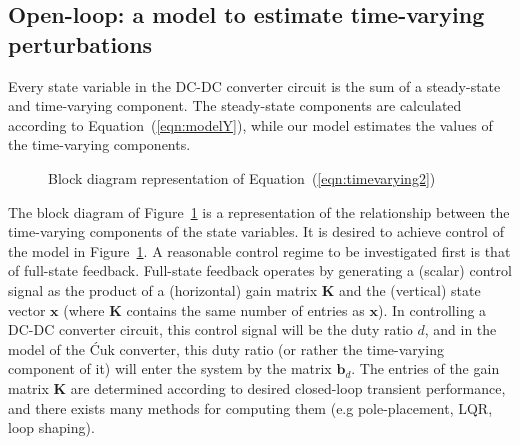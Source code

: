 \subsection{Open-loop: a model to estimate time-varying perturbations}
Every state variable in the DC-DC converter circuit is the sum of a steady-state and time-varying component. The steady-state components are calculated according to Equation~(\ref{eqn:modelY}), while our model estimates the values of the time-varying components.
\begin{figure}[H]
\centering
{}
\caption{Block diagram representation of Equation~(\ref{eqn:timevarying2})}
\label{block:openloop}
\end{figure}
The block diagram of Figure~\ref{block:openloop} is a representation of the relationship between the time-varying components of the state variables.
\newpar
It is desired to achieve control of the model in Figure~\ref{block:openloop}. A reasonable control regime to be investigated first is that of full-state feedback. Full-state feedback operates by generating a (scalar) control signal as the product of a (horizontal) gain matrix $\boldsymbol{K}$ and the (vertical) state vector $\boldsymbol{x}$ (where $\boldsymbol{K}$ contains the same number of entries as $\boldsymbol{x}$). In controlling a DC-DC converter circuit, this control signal will be the duty ratio $d$, and in the model of the \'Cuk converter, this duty ratio (or rather the time-varying component of it) will enter the system by the matrix $\boldsymbol{b}_d$. The entries of the gain matrix $\boldsymbol{K}$ are determined according to desired closed-loop transient performance, and there exists many methods for computing them (e.g pole-placement, LQR, loop shaping).
